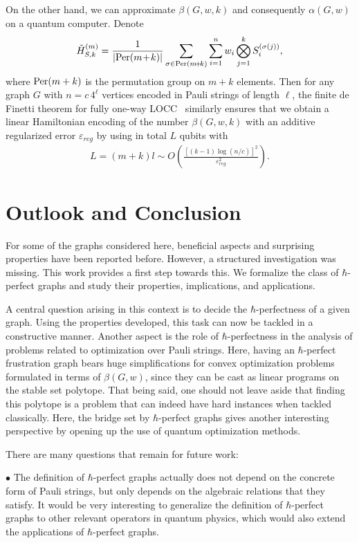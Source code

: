 \documentclass[
12pt,
prx,
aps,
reprint,
a4paper,
longbibliograph,
nofootinbib,
nobibnotes,
superscriptaddress
]{revtex4-2}
\theoremstyle{definition}
\begin{document}
On the other hand, we can approximate $\beta(G,w,k)$ and consequently $\alpha(G,w)$ on a quantum computer. Denote
\begin{equation}
    \tilde{H}_{S,k}^{(m)} = \frac{1}{|{\rm Per}(m\!+\!k)|} \sum_{\sigma\in {\rm Per}(m\!+\!k)} \sum_{i=1}^n w_i \bigotimes_{j=1}^k S_i^{(\sigma(j))},
\end{equation}
where ${\rm Per}(m+k)$ is the permutation group on $m+k$ elements. 
Then for any graph $G$ with $n=c\,4^\ell$ vertices encoded in Pauli strings of length $\ell$, the finite de Finetti theorem for fully one-way LOCC~\cite[Thm. 1]{li2015quantum} similarly ensures that
we obtain a linear Hamiltonian encoding of the number $\beta(G,w,k)$ with an additive regularized error $\varepsilon_{reg}$
    by using in total $L$ qubits with 
    \begin{align}
        L=(m+k)l\sim  O\left(\frac{[(k-1)\log(n/c)]^2 }{\varepsilon_{reg}^2}\right).
    \end{align}
\section{Outlook and Conclusion}\label{sec:conclusion}
For some of the graphs considered here, beneficial aspects and surprising properties have been reported before. However, a structured investigation was missing. This work provides a first step towards this. 
We formalize the class of $\hbar$-perfect graphs and study their properties, implications, and applications. 

A central question arising in this context is to decide the $\hbar$-perfectness of a given graph. Using the properties developed, this task can now be tackled in a constructive manner. 
Another aspect is the role of $\hbar$-perfectness in the analysis of problems related to optimization over Pauli strings. Here, having an $\hbar$-perfect frustration graph bears huge simplifications for convex optimization problems formulated in terms of $\beta(G,w)$, since they can be cast as linear programs on the stable set polytope. 
That being said, one should not leave aside that finding this polytope is a problem that can indeed have hard instances when tackled classically. 
Here, the bridge set by $\hbar$-perfect graphs gives another interesting perspective by opening up the use of quantum optimization methods. 

There are many questions that remain for future work:

$\bullet$ The definition of $\hbar$-perfect graphs actually does not depend on the concrete form of Pauli strings, but only depends on the algebraic relations that they satisfy. It would be very interesting to generalize the definition of $\hbar$-perfect graphs to other relevant operators in quantum physics, which would also extend the applications of $\hbar$-perfect graphs.
\end{document}
